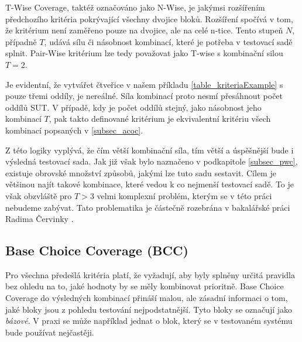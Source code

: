 T-Wise Coverage, taktéž označováno jako N-Wise, je jakýmsi rozšířením předchozího kritéria pokrývající všechny dvojice bloků. Rozšíření spočívá v tom, že kritérium není zaměřeno pouze na dvojice, ale na celé n-tice. Tento stupeň $N$, případně $T$, udává sílu či násobnost kombinací, které je potřeba v testovací sadě splnit. Pair-Wise kritérium lze tedy považovat jako T-wise s kombinační silou $T=2$. 

Je evidentní, že vytvářet čtveřice v našem příkladu \ref{table_kriteriaExample} s pouze třemi oddíly, je nereálné. Síla kombinací proto nesmí přesáhnout počet oddílů SUT. V případě, kdy je počet oddílů stejný, jako násobnost jeho kombinací $T$, pak takto definované kritérium je ekvivalentní kritériu všech kombinací popsaných v \ref{subsec_acoc}. 

Z této logiky vyplývá, že čím větší kombinační síla, tím větší a úspěšnější bude i výsledná testovací sada. Jak již však bylo naznačeno v podkapitole \ref{subsec_pwc}, existuje obrovské množství způsobů, jakými lze tuto sadu sestavit. Cílem je většinou najít takové kombinace, které vedou k co nejmenší testovací sadě. To je však obzvláště pro $T>3$ velmi komplexní problém, kterým se v této práci nebudeme zabývat. Tato problematika je částečně rozebrána v bakalářské práci Radima Červinky \cite{1_Combine}. 



\subsection*{Base Choice Coverage (BCC)}
\label{subsec_BCC}
Pro všechna předešlá kritéria platí, že vyžadují, aby byly splněny určitá pravidla bez ohledu na to, jaké hodnoty by se měly kombinovat prioritně. Base Choice Coverage do výsledných kombinací přináší malou, ale zásadní informaci o tom, jaké bloky jsou z pohledu testování nejpodstatnější. Tyto bloky se označují jako \textit{bázové}. V praxi se může například jednat o blok, který se v testovaném systému bude používat nejčastěji. 

